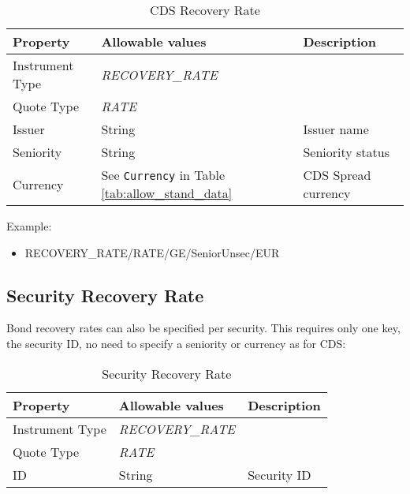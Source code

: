 \begin{table}[H]
\centering
  \begin{tabular}{|p{3cm}|p{3.5cm}|p{7cm}|}
    \hline
    {\bf Property} & {\bf Allowable values} & {\bf Description} \\ \hline
    Instrument Type & \emph{RECOVERY\_RATE} & \\ \hline
    Quote Type & \emph{RATE} & \\ \hline
    Issuer & String &  Issuer name \\ \hline
    Seniority & String &  Seniority status \\ \hline
    Currency & See \lstinline!Currency! in Table \ref{tab:allow_stand_data} & CDS Spread currency\\ \hline
  \end{tabular}
  \caption{CDS Recovery Rate}
  \label{tab:cdsrecovery_quote}
\end{table}

Example:
\begin{itemize}
\item {RECOVERY\_RATE/RATE/GE/SeniorUnsec/EUR}
\end{itemize}

\subsection{Security Recovery Rate}\label{md:sec_rec_rates}

Bond recovery rates can also be specified per security. This requires only one key, the security ID, no need to specify a seniority or currency as for CDS:

\begin{table}[H]
\centering
  \begin{tabular}{|p{3cm}|p{3.5cm}|p{7cm}|}
    \hline
    {\bf Property} & {\bf Allowable values} & {\bf Description} \\ \hline
    Instrument Type & \emph{RECOVERY\_RATE} & \\ \hline
    Quote Type & \emph{RATE} & \\ \hline
    ID & String &  Security ID \\ \hline
  \end{tabular}
  \caption{Security Recovery Rate}
  \label{tab:secrecrate_quote}
\end{table}

